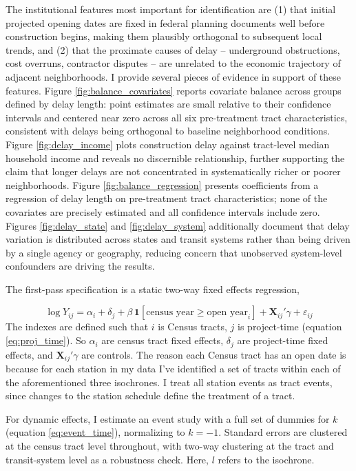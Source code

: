 \documentclass[12pt]{article}
\begin{document}
The institutional features most important for identification are (1) that initial projected opening dates are fixed in federal planning documents well before construction begins, making them plausibly orthogonal to subsequent local trends, and (2) that the proximate causes of delay  --  underground obstructions, cost overruns, contractor disputes  --  are unrelated to the economic trajectory of adjacent neighborhoods. I provide several pieces of evidence in support of these features. Figure \ref{fig:balance_covariates} reports covariate balance across groups defined by delay length: point estimates are small relative to their confidence intervals and centered near zero across all six pre-treatment tract characteristics, consistent with delays being orthogonal to baseline neighborhood conditions. Figure \ref{fig:delay_income} plots construction delay against tract-level median household income and reveals no discernible relationship, further supporting the claim that longer delays are not concentrated in systematically richer or poorer neighborhoods. Figure \ref{fig:balance_regression} presents coefficients from a regression of delay length on pre-treatment tract characteristics; none of the covariates are precisely estimated and all confidence intervals include zero. Figures \ref{fig:delay_state} and \ref{fig:delay_system} additionally document that delay variation is distributed across states and transit systems rather than being driven by a single agency or geography, reducing concern that unobserved system-level confounders are driving the results.

The first-pass specification is a static two-way fixed effects regression,

$$\log Y_{ij} = \alpha_i + \delta_j + \beta\, \mathbf{1}[\text{census year} \geq \text{open year}_i] + \mathbf{X}_{ij}'\gamma + \varepsilon_{ij}$$
The indexes are defined such that $i$ is Census tracts, $j$ is project-time (equation \ref{eq:proj_time}). So $\alpha_i$ are census tract fixed effects, $\delta_j$ are project-time fixed effects, and $\mathbf{X}_{ij}'\gamma$ are controls. The reason each Census tract has an open date is because for each station in my data I've identified a set of tracts within each of the aforementioned three isochrones. I treat all station events as tract events, since changes to the station schedule define the treatment of a tract. 

For dynamic effects, I estimate an event study with a full set of dummies for $k$ (equation \ref{eq:event_time}), normalizing to $k = -1$. Standard errors are clustered at the census tract level throughout, with two-way clustering at the tract and transit-system level as a robustness check. Here, $l$ refers to the isochrone.
\end{document}
